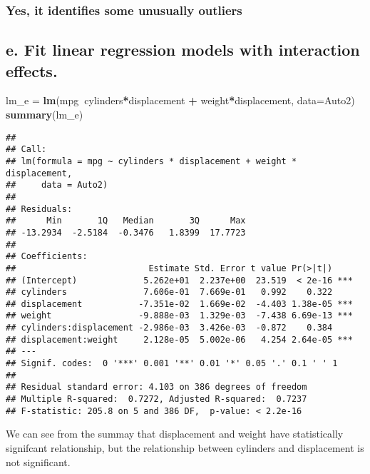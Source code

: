 \documentclass[]{article}
\newenvironment{Shaded}{\begin{snugshade}}{\end{snugshade}}
\newcommand{\DataTypeTok}[1]{\textcolor[rgb]{0.13,0.29,0.53}{#1}}
\newcommand{\KeywordTok}[1]{\textcolor[rgb]{0.13,0.29,0.53}{\textbf{#1}}}
\newcommand{\NormalTok}[1]{#1}
\newcommand{\OperatorTok}[1]{\textcolor[rgb]{0.81,0.36,0.00}{\textbf{#1}}}
\newcommand{\StringTok}[1]{\textcolor[rgb]{0.31,0.60,0.02}{#1}}
\begin{document}
\hypertarget{yes-it-identifies-some-unusually-outliers}{%
\subsubsection{Yes, it identifies some unusually
outliers}\label{yes-it-identifies-some-unusually-outliers}}

\hypertarget{e.-fit-linear-regression-models-with-interaction-effects.}{%
\subsection{e. Fit linear regression models with interaction
effects.}\label{e.-fit-linear-regression-models-with-interaction-effects.}}

\begin{Shaded}
\begin{Highlighting}[]
\NormalTok{lm_e =}\StringTok{ }\KeywordTok{lm}\NormalTok{(mpg}\OperatorTok{~}\NormalTok{cylinders}\OperatorTok{*}\NormalTok{displacement }\OperatorTok{+}\StringTok{ }\NormalTok{weight}\OperatorTok{*}\NormalTok{displacement, }\DataTypeTok{data=}\NormalTok{Auto2)}
\KeywordTok{summary}\NormalTok{(lm_e)}
\end{Highlighting}
\end{Shaded}

\begin{verbatim}
## 
## Call:
## lm(formula = mpg ~ cylinders * displacement + weight * displacement, 
##     data = Auto2)
## 
## Residuals:
##      Min       1Q   Median       3Q      Max 
## -13.2934  -2.5184  -0.3476   1.8399  17.7723 
## 
## Coefficients:
##                          Estimate Std. Error t value Pr(>|t|)    
## (Intercept)             5.262e+01  2.237e+00  23.519  < 2e-16 ***
## cylinders               7.606e-01  7.669e-01   0.992    0.322    
## displacement           -7.351e-02  1.669e-02  -4.403 1.38e-05 ***
## weight                 -9.888e-03  1.329e-03  -7.438 6.69e-13 ***
## cylinders:displacement -2.986e-03  3.426e-03  -0.872    0.384    
## displacement:weight     2.128e-05  5.002e-06   4.254 2.64e-05 ***
## ---
## Signif. codes:  0 '***' 0.001 '**' 0.01 '*' 0.05 '.' 0.1 ' ' 1
## 
## Residual standard error: 4.103 on 386 degrees of freedom
## Multiple R-squared:  0.7272, Adjusted R-squared:  0.7237 
## F-statistic: 205.8 on 5 and 386 DF,  p-value: < 2.2e-16
\end{verbatim}

We can see from the summay that displacement and weight have
statistically signifcant relationship, but the relationship between
cylinders and displacement is not significant.
\end{document}

